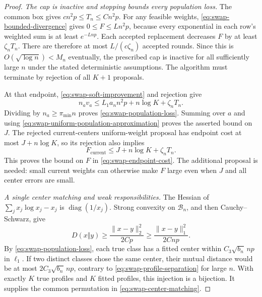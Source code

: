 \begin{proof}
\emph{The cap is inactive and stopping bounds every population loss.}
The common box gives $cn^2p\le T_n\le Cn^2p$.
For any feasible weights, \eqref{eq:swap-bounded-divergence} gives
$0\le F\le Ln^2p$, because every exponential in each row's
weighted sum is at least $e^{-Lnp}$. Each accepted replacement
decreases $F$ by at least $\zeta_nT_n$. There are therefore at most
$L/(c\zeta_n)$ accepted rounds. Since this is
$O(\sqrt{\log n})<M_n$ eventually, the prescribed cap is inactive for
all sufficiently large $n$ under the stated deterministic assumptions.
The algorithm must terminate by rejection of all $K+1$ proposals.

At that endpoint, \eqref{eq:swap-soft-improvement} and rejection give
\[
 n_av_a\le L_1a_n n^2p+n\log K+\zeta_nT_n.
\]
Dividing by $n_a\ge\pi_{\min}n$ proves
\eqref{eq:swap-population-loss}. Summing over $a$ and using
\eqref{eq:swap-uniform-population-approximation} proves the asserted
bound on $J$. The rejected current-centers uniform-weight proposal has
endpoint cost at most $J+n\log K$, so its rejection also implies
\[
 F_{\mathrm{current}}\le J+n\log K+\zeta_nT_n.
\]
This proves the bound on $F$ in \eqref{eq:swap-endpoint-cost}. The
additional proposal is needed: small current weights can otherwise
make $F$ large even when $J$ and all center errors are small.

\emph{A single center matching and weak responsibilities.}
The Hessian of $\sum_jx_j\log x_j-x_j$ is
$\operatorname{diag}(1/x_j)$. Strong convexity on $\mathcal B_n$, and
then Cauchy--Schwarz, give
\begin{equation}
 D(x\Vert y)\ge\frac{\|x-y\|_2^2}{2Cp}
              \ge\frac{\|x-y\|_1^2}{2Cnp}.
 \label{eq:swap-strong-convexity}
\end{equation}
By \eqref{eq:swap-population-loss}, each true class has a fitted
center within $C_3\sqrt{b_n}\,np$ in $\ell_1$.
If two distinct classes chose the same center, their mutual distance
would be at most $2C_3\sqrt{b_n}\,np$, contrary to
\eqref{eq:swap-profile-separation} for large $n$. With exactly $K$
true profiles and $K$ fitted profiles, this injection is a bijection.
It supplies the common permutation in \eqref{eq:swap-center-matching}.


\end{proof}
